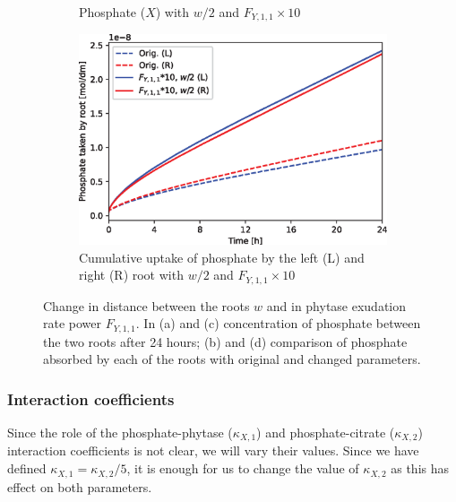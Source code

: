 \documentclass[11pt]{article}
\numberwithin{equation}{section}
\begin{document}
\begin{figure}[!htb]
\begin{subfigure}[t]{0.35\textwidth}
    \caption{Phosphate ($X$) with $w/2$ and $F_{Y,1,1} \times 10$}
    \label{fig:numexp_FY11w1}
\end{subfigure}
\hspace{1cm}
\begin{subfigure}[t]{0.4\textwidth}
    \includegraphics[width=\textwidth]{Figures/FY11times10wdivby2.eps}
    \caption{Cumulative uptake of phosphate by the left (L) and right (R) root with $w/2$ and $F_{Y,1,1} \times 10$}
    \label{fig:numexp_FY11w2}
\end{subfigure}

\caption{Change in distance between the roots $w$ and in phytase exudation rate power $F_{Y,1,1}$. In (a) and (c) concentration of phosphate between the two roots after 24 hours; (b) and (d) comparison of phosphate absorbed by each of the roots with original and changed parameters.}
\label{fig:numexp_F11w}
\end{figure}

\subsubsection{Interaction coefficients}

Since the role of the phosphate-phytase ($\kappa_{X,1}$) and phosphate-citrate ($\kappa_{X,2}$) interaction coefficients is not clear, we will vary their values. Since we have defined $\kappa_{X,1}=\kappa_{X,2} / 5$, it is enough for us to change the value of $\kappa_{X,2}$ as this has effect on both parameters.
\end{document}
